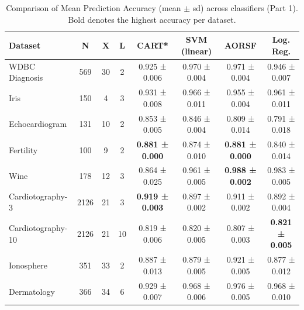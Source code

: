 \begin{table}
\centering
\caption{\label{tab:tbl-benchmark-model-latex-a}Comparison of Mean Prediction Accuracy (mean \(\pm\) sd) across classifiers (Part 1). Bold denotes the highest accuracy per dataset.}
\centering
\fontsize{6}{8}\selectfont
\begin{tabular}[t]{l|c|c|c|c|c|c|c}
\hline
Dataset & N & X & L & CART* & SVM (linear) & AORSF & Log. Reg.\\
\hline
WDBC Diagnosis & 569 & 30 & 2 & 0.925 ± 0.006 & 0.970 ± 0.004 & 0.971 ± 0.004 & 0.946 ± 0.007\\
\hline
Iris & 150 & 4 & 3 & 0.931 ± 0.008 & 0.966 ± 0.011 & 0.955 ± 0.004 & 0.961 ± 0.011\\
\hline
Echocardiogram & 131 & 10 & 2 & 0.853 ± 0.005 & 0.846 ± 0.004 & 0.809 ± 0.014 & 0.791 ± 0.018\\
\hline
Fertility & 100 & 9 & 2 & \textbf{0.881 ± 0.000} & 0.874 ± 0.010 & \textbf{0.881 ± 0.000} & 0.840 ± 0.014\\
\hline
Wine & 178 & 12 & 3 & 0.864 ± 0.025 & 0.961 ± 0.005 & \textbf{0.988 ± 0.002} & 0.983 ± 0.005\\
\hline
Cardiotography-3 & 2126 & 21 & 3 & \textbf{0.919 ± 0.003} & 0.897 ± 0.002 & 0.911 ± 0.002 & 0.892 ± 0.004\\
\hline
Cardiotography-10 & 2126 & 21 & 10 & 0.819 ± 0.006 & 0.820 ± 0.005 & 0.807 ± 0.003 & \textbf{0.821 ± 0.005}\\
\hline
Ionosphere & 351 & 33 & 2 & 0.887 ± 0.013 & 0.879 ± 0.005 & 0.921 ± 0.005 & 0.877 ± 0.012\\
\hline
Dermatology & 366 & 34 & 6 & 0.929 ± 0.007 & 0.968 ± 0.006 & 0.976 ± 0.005 & 0.968 ± 0.010\\
\hline
\end{tabular}
\end{table}

